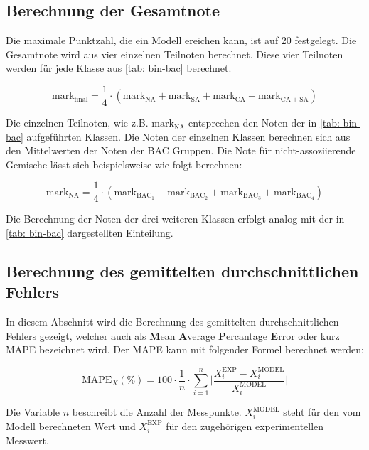 \documentclass[../thesis.tex]{subfiles}
\begin{document}
\subsection{Berechnung der Gesamtnote}
Die maximale Punktzahl, die ein Modell ereichen kann, ist auf 20 festgelegt. Die Gesamtnote wird aus vier einzelnen Teilnoten berechnet. Diese vier Teilnoten werden für jede Klasse aus \autoref{tab: bin-bac} berechnet.

\begin{equation}
	\mathrm{mark}_{\mathrm{final}} = \dfrac{1}{4} \cdot \left( 
		\mathrm{mark}_{\mathrm{NA}} + \mathrm{mark}_{\mathrm{SA}} + \mathrm{mark}_{\mathrm{CA}} + \mathrm{mark}_{\mathrm{CA + SA}} 
	 \right)
	 \label{eq: mark_final}
\end{equation}

Die einzelnen Teilnoten, wie z.B. $\mathrm{mark}_{\mathrm{NA}}$ entsprechen den Noten der in \autoref{tab: bin-bac} aufgeführten Klassen. Die Noten der einzelnen Klassen berechnen sich aus den Mittelwerten der Noten der BAC Gruppen. Die Note für nicht-assoziierende Gemische lässt sich beispielsweise wie folgt berechnen:

\begin{equation}
	\mathrm{mark}_{\mathrm{NA}} = \dfrac{1}{4} \cdot \left(
		\mathrm{mark}_{\mathrm{BAC_1}} + \mathrm{mark}_{\mathrm{BAC_2}} + \mathrm{mark}_{\mathrm{BAC_3}} + \mathrm{mark}_{\mathrm{BAC_4}}
	\right)
\end{equation}

Die Berechnung der Noten der drei weiteren Klassen erfolgt analog mit der in \autoref{tab: bin-bac} dargestellten Einteilung.

\subsection{Berechnung des gemittelten durchschnittlichen Fehlers}
In diesem Abschnitt wird die Berechnung des gemittelten durchschnittlichen Fehlers gezeigt, welcher auch als \textbf{M}ean \textbf{A}verage \textbf{P}ercantage \textbf{E}rror oder kurz MAPE bezeichnet wird. Der MAPE kann mit folgender Formel berechnet werden:

\begin{equation}
	\mathrm{MAPE}_X(\%) = 100 \cdot \dfrac{1}{n} \cdot \sum_{i=1}^{n} \biggl| \dfrac{X_i^\mathrm{EXP} - X_i^\mathrm{MODEL}}{X_i^\mathrm{MODEL}} \biggr|
	\label{MAPE Glg}
\end{equation}

Die Variable $n$ beschreibt die Anzahl der Messpunkte. $X_i^\mathrm{MODEL}$ steht für den vom Modell berechneten Wert und $X_i^\mathrm{EXP}$ für den zugehörigen experimentellen Messwert.
\end{document}
